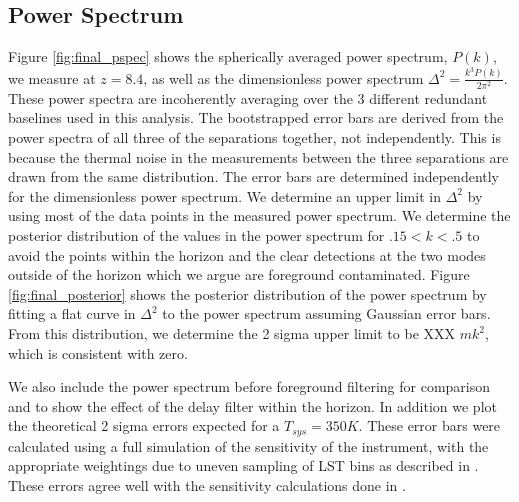 \documentclass[twocolumn,numberedappendix]{emulateapj} \shorttitle{PSA64}
\begin{document}
\subsection{Power Spectrum}
Figure \ref{fig:final_pspec} shows the spherically averaged power spectrum,
$P(k)$, we measure at $z=8.4$, as well as the dimensionless power spectrum
$\Delta^{2} = \frac{k^{3}P(k)}{2\pi^{2}}$. These power spectra are incoherently
averaging over the 3 different redundant baselines used in this analysis. The
bootstrapped error bars are derived from the power spectra of all three of the
separations together, not independently. This is because the thermal noise in
the measurements between the three separations are drawn from the same
distribution. The error bars are determined independently for the dimensionless
power spectrum. We determine an upper limit in $\Delta^{2}$ by using most of the
data points in the measured power spectrum. We determine the posterior
distribution of the values in the power spectrum for $.15<k<.5$ to avoid the
points within the horizon and the clear detections at the two modes outside of
the horizon which we argue are foreground contaminated. Figure
\ref{fig:final_posterior} shows the posterior distribution of the power spectrum
by fitting a flat curve in $\Delta^{2}$ to the power spectrum assuming
Gaussian error bars. From this distribution, we determine the 2 sigma upper
limit to be XXX $mk^{2}$, which is consistent with zero.

We also include the power spectrum before foreground filtering for comparison
and to show the effect of the delay filter within the horizon. In addition we
plot the theoretical 2 sigma errors expected for a $T_{sys} = 350 K$. These
error bars were calculated using a full simulation of the sensitivity of the
instrument, with the appropriate weightings due to uneven sampling of LST bins
as described in \cite{pober_et_al2014}. These errors agree well with the
sensitivity calculations done in \cite{parsons_et_al2012a}. 
\end{document}
